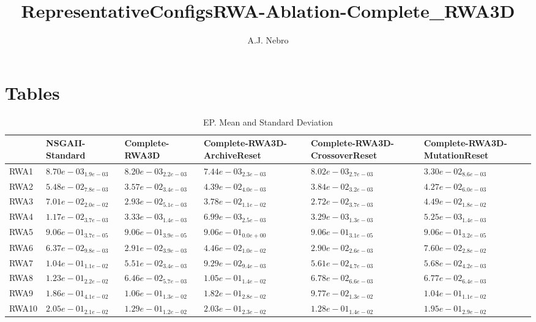 \documentclass{article}
\title{RepresentativeConfigsRWA-Ablation-Complete_RWA3D}
\author{A.J. Nebro}
\begin{document}
\maketitle
\section{Tables}

\begin{table}
\caption{EP. Mean and Standard Deviation}
\label{table: EP}
\centering
\begin{scriptsize}
\begin{tabular}{llllll}
\hline & NSGAII-Standard & Complete-RWA3D & Complete-RWA3D-ArchiveReset & Complete-RWA3D-CrossoverReset &  Complete-RWA3D-MutationReset\\
\hline 
RWA1 & $  8.70e-03_{ 1.9e-03}$ & $  8.20e-03_{ 2.2e-03}$ & \cellcolor{gray95}$  7.44e-03_{ 2.3e-03}$ & \cellcolor{gray25}$  8.02e-03_{ 2.7e-03}$ & $  3.30e-02_{ 8.6e-03}$ \\
RWA2 & $  5.48e-02_{ 7.8e-03}$ & \cellcolor{gray95}$  3.57e-02_{ 3.4e-03}$ & $  4.39e-02_{ 4.0e-03}$ & \cellcolor{gray25}$  3.84e-02_{ 3.2e-03}$ & $  4.27e-02_{ 6.0e-03}$ \\
RWA3 & $  7.01e-02_{ 2.0e-02}$ & \cellcolor{gray25}$  2.93e-02_{ 5.1e-03}$ & $  3.78e-02_{ 1.1e-02}$ & \cellcolor{gray95}$  2.72e-02_{ 3.7e-03}$ & $  4.49e-02_{ 1.8e-02}$ \\
RWA4 & $  1.17e-02_{ 3.7e-03}$ & \cellcolor{gray25}$  3.33e-03_{ 1.4e-03}$ & $  6.99e-03_{ 2.5e-03}$ & \cellcolor{gray95}$  3.29e-03_{ 1.3e-03}$ & $  5.25e-03_{ 1.4e-03}$ \\
RWA5 & $  9.06e-01_{ 3.7e-05}$ & $  9.06e-01_{ 3.9e-05}$ & \cellcolor{gray95}$  9.06e-01_{ 0.0e+00}$ & \cellcolor{gray25}$  9.06e-01_{ 3.1e-05}$ & $  9.06e-01_{ 3.2e-05}$ \\
RWA6 & $  6.37e-02_{ 9.8e-03}$ & \cellcolor{gray25}$  2.91e-02_{ 3.9e-03}$ & $  4.46e-02_{ 1.0e-02}$ & \cellcolor{gray95}$  2.90e-02_{ 2.6e-03}$ & $  7.60e-02_{ 2.8e-02}$ \\
RWA7 & $  1.04e-01_{ 1.1e-02}$ & \cellcolor{gray95}$  5.51e-02_{ 3.4e-03}$ & $  9.29e-02_{ 9.4e-03}$ & \cellcolor{gray25}$  5.61e-02_{ 4.7e-03}$ & $  5.68e-02_{ 4.2e-03}$ \\
RWA8 & $  1.23e-01_{ 2.2e-02}$ & \cellcolor{gray95}$  6.46e-02_{ 5.7e-03}$ & $  1.05e-01_{ 1.4e-02}$ & $  6.78e-02_{ 6.6e-03}$ & \cellcolor{gray25}$  6.77e-02_{ 6.4e-03}$ \\
RWA9 & $  1.86e-01_{ 4.1e-02}$ & $  1.06e-01_{ 1.3e-02}$ & $  1.82e-01_{ 2.8e-02}$ & \cellcolor{gray95}$  9.77e-02_{ 1.3e-02}$ & \cellcolor{gray25}$  1.04e-01_{ 1.1e-02}$ \\
RWA10 & $  2.05e-01_{ 2.1e-02}$ & \cellcolor{gray25}$  1.29e-01_{ 1.2e-02}$ & $  2.03e-01_{ 2.3e-02}$ & \cellcolor{gray95}$  1.28e-01_{ 1.4e-02}$ & $  1.95e-01_{ 2.9e-02}$ \\
\hline
\end{tabular}
\end{scriptsize}
\end{table}
\end{document}
